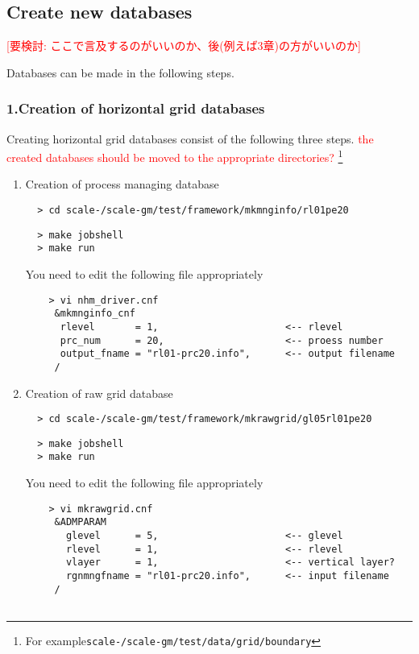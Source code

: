 \subsection{Create new databases}
\textcolor{red}{[要検討: ここで言及するのがいいのか、後(例えば3章)の方がいいのか]}

Databases can be made in the following steps.
\subsubsection{1.Creation of horizontal grid databases}
Creating horizontal grid databases consist of the following three steps.
\textcolor{red}{the created databases should be moved to the appropriate directories?}
\footnote{For example\texttt{scale-{\version}/scale-gm/test/data/grid/boundary}}
\renewcommand{\labelenumi}{(\roman{enumi})}
\begin{enumerate}

\item{Creation of process managing database} 

\verb|  > cd scale-|{\version}\verb|/scale-gm/test/framework/mkmnginfo/rl01pe20|
\vspace{-4mm}
\begin{verbatim}
  > make jobshell
  > make run
\end{verbatim}
You need to edit the following file appropriately
 \begin{verbatim}
    > vi nhm_driver.cnf
     &mkmnginfo_cnf
      rlevel       = 1,                      <-- rlevel 
      prc_num      = 20,                     <-- proess number
      output_fname = "rl01-prc20.info",      <-- output filename
     /
 \end{verbatim}

\item{Creation of raw grid database}

\verb|  > cd scale-|{\version}\verb|/scale-gm/test/framework/mkrawgrid/gl05rl01pe20|
\vspace{-4mm}
\begin{verbatim}
  > make jobshell
  > make run
\end{verbatim}
You need to edit the following file appropriately
 \begin{verbatim}
    > vi mkrawgrid.cnf
     &ADMPARAM
       glevel      = 5,                      <-- glevel
       rlevel      = 1,                      <-- rlevel
       vlayer      = 1,                      <-- vertical layer?
       rgnmngfname = "rl01-prc20.info",      <-- input filename 
     /


\end{verbatim}
\end{enumerate}
